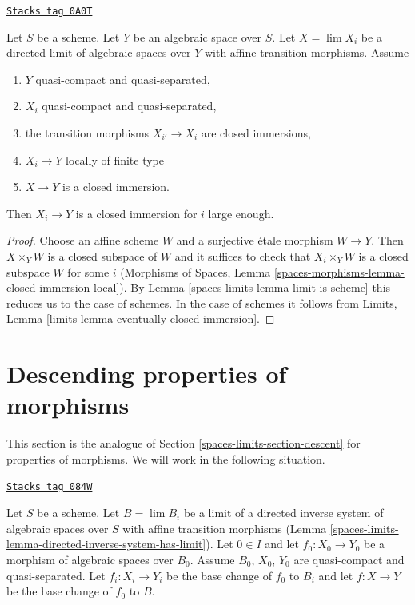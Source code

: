 \begin{lemma}
\label{spaces-limits-lemma-eventually-closed-immersion}
\href{https://stacks.math.columbia.edu/tag/0A0T}{\texttt{Stacks tag 0A0T}}

Let $S$ be a scheme. Let $Y$ be an algebraic space over $S$.
Let $X = \lim X_i$ be a directed limit of algebraic spaces
over $Y$ with affine transition morphisms. Assume
\begin{enumerate}
\item $Y$ quasi-compact and quasi-separated,
\item $X_i$ quasi-compact and quasi-separated,
\item the transition morphisms $X_{i'} \to X_i$ are closed immersions,
\item $X_i \to Y$ locally of finite type
\item $X \to Y$ is a closed immersion.
\end{enumerate}
Then $X_i \to Y$ is a closed immersion for $i$ large enough.
\end{lemma}

\begin{proof}
Choose an affine scheme $W$ and a surjective \'etale morphism $W \to Y$.
Then $X \times_Y W$ is a closed subspace of $W$ and it suffices to check
that $X_i \times_Y W$ is a closed subspace $W$ for some $i$
(Morphisms of Spaces,
Lemma \ref{spaces-morphisms-lemma-closed-immersion-local}). By
Lemma \ref{spaces-limits-lemma-limit-is-scheme} this reduces us to the case of schemes.
In the case of schemes it follows from
Limits, Lemma \ref{limits-lemma-eventually-closed-immersion}.
\end{proof}

\section{Descending properties of morphisms}
\label{spaces-limits-section-descent-of-properties}
This section is the analogue of Section \ref{spaces-limits-section-descent}
for properties of morphisms. We will work in the following situation.

\begin{definition}
\label{spaces-limits-situation-descent-property}
\href{https://stacks.math.columbia.edu/tag/084W}{\texttt{Stacks tag 084W}}

Let $S$ be a scheme. Let $B = \lim B_i$ be a limit of a directed inverse system
of algebraic spaces over $S$ with affine transition morphisms
(Lemma \ref{spaces-limits-lemma-directed-inverse-system-has-limit}).
Let $0 \in I$ and let $f_0 : X_0 \to Y_0$ be a morphism of algebraic spaces
over $B_0$. Assume $B_0$, $X_0$, $Y_0$ are quasi-compact and quasi-separated.
Let $f_i : X_i \to Y_i$ be the base change of $f_0$ to $B_i$ and
let $f : X \to Y$ be the base change of $f_0$ to $B$.
\end{definition}

